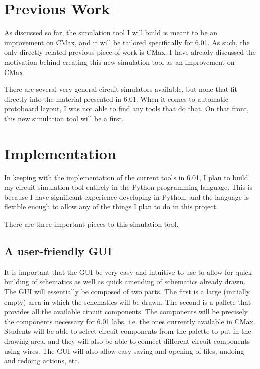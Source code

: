 \documentclass[12pt, doublespacing]{amsart}
\begin{document}
\section{Previous Work}
\label{sec:previouswork}

As discussed so far, the simulation tool I will build is meant to be an improvement on CMax, and it will be tailored specifically for 6.01. As such, the only directly related previous piece of work is CMax. I have already discussed the motivation behind creating this new simulation tool as an improvement on CMax.

There are several very general circuit simulators available, but none that fit directly into the material presented in 6.01. When it comes to automatic protoboard layout, I was not able to find any tools that do that. On that front, this new simulation tool will be a first.

\section{Implementation}
\label{sec:implementation}

In keeping with the implementation of the current tools in 6.01, I plan to build my circuit simulation tool entirely in the Python programming language. This is because I have significant experience developing in Python, and the language is flexible enough to allow any of the things I plan to do in this project.

There are three important pieces to this simulation tool.

\subsection{A user-friendly GUI}

It is important that the GUI be very easy and intuitive to use to allow for quick building of schematics as well as quick amending of schematics already drawn. The GUI will essentially be composed of two parts. The first is a large (initially empty) area in which the schematics will be drawn. The second is a pallete that provides all the available circuit components. The components will be precisely the components necessary for 6.01 labs, i.e. the ones currently available in CMax. Students will be able to select circuit components from the palette to put in the drawing area, and they will also be able to connect different circuit components using wires. The GUI will also allow easy saving and opening of files, undoing and redoing actions, etc.
\end{document}
